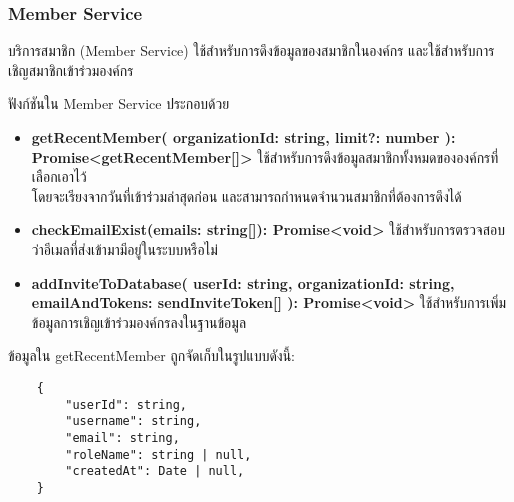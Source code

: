 \subsubsection{Member Service}

\ifenglish
\else
บริการสมาชิก (Member Service) ใช้สำหรับการดึงข้อมูลของสมาชิกในองค์กร และใช้สำหรับการเชิญสมาชิกเข้าร่วมองค์กร

ฟังก์ชันใน Member Service ประกอบด้วย

\begin{itemize}
    \item \textbf{getRecentMember(
        organizationId: string,
        limit?: number
      ): \\Promise<getRecentMember[]>} ใช้สำหรับการดึงข้อมูลสมาชิกทั้งหมดขององค์กรที่เลือกเอาไว้ \\โดยจะเรียงจากวันที่เข้าร่วมล่าสุดก่อน และสามารถกำหนดจำนวนสมาชิกที่ต้องการดึงได้
    \item \textbf{checkEmailExist(emails: string[]): Promise<void>} ใช้สำหรับการตรวจสอบว่าอีเมลที่ส่งเข้ามามีอยู่ในระบบหรือไม่
    \item \textbf{addInviteToDatabase(
        userId: string,
        organizationId: string,
        emailAndTokens: sendInviteToken[]
      ): Promise<void>} ใช้สำหรับการเพิ่มข้อมูลการเชิญเข้าร่วมองค์กรลงในฐานข้อมูล
\end{itemize}

ข้อมูลใน getRecentMember ถูกจัดเก็บในรูปแบบดังนี้:
\begin{lstlisting}
    {  
        "userId": string,
        "username": string,
        "email": string,
        "roleName": string | null,
        "createdAt": Date | null,
    }
\end{lstlisting}
\fi